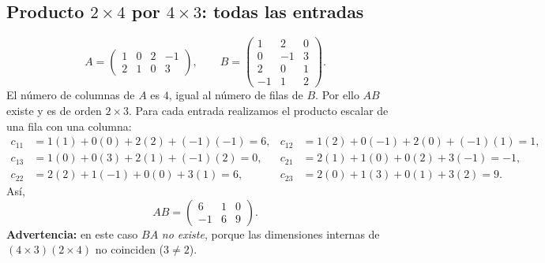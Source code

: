 \documentclass[12pt]{article}
\theoremstyle{remark}
\begin{document}
\subsection{Producto $2\times4$ por $4\times3$: todas las entradas}
\[
A=\begin{pmatrix}1&0&2&-1\\2&1&0&3\end{pmatrix},\qquad
B=\begin{pmatrix}1&2&0\\0&-1&3\\2&0&1\\-1&1&2\end{pmatrix}.
\]
El número de columnas de $A$ es $4$, igual al número de filas de $B$. Por ello $AB$ existe y es de orden $2\times3$. Para cada entrada realizamos el producto escalar de una fila con una columna:
\begin{align*}
c_{11}&=1(1)+0(0)+2(2)+(-1)(-1)=6, &c_{12}&=1(2)+0(-1)+2(0)+(-1)(1)=1,\\
c_{13}&=1(0)+0(3)+2(1)+(-1)(2)=0, &c_{21}&=2(1)+1(0)+0(2)+3(-1)=-1,\\
c_{22}&=2(2)+1(-1)+0(0)+3(1)=6, &c_{23}&=2(0)+1(3)+0(1)+3(2)=9.
\end{align*}
Así,
\[\boxed{AB=\begin{pmatrix}6&1&0\\-1&6&9\end{pmatrix}.}\]
\textbf{Advertencia:} en este caso $BA$ \emph{no existe}, porque las dimensiones internas de $(4\times3)(2\times4)$ no coinciden ($3\ne2$).
\end{document}
